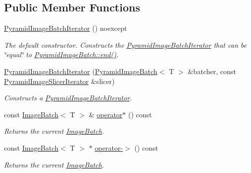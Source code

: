 \subsection*{Public Member Functions}
\begin{DoxyCompactItemize}
\item 
\hyperlink{group___imagery_module_ga9859e48a78c1a93cbc5d6ec39bfa33c4}{Pyramid\+Image\+Batch\+Iterator} () noexcept
\begin{DoxyCompactList}\small\item\em The default constructor. Constructs the \hyperlink{classdg_1_1deepcore_1_1imagery_1_1_pyramid_image_batch_iterator}{Pyramid\+Image\+Batch\+Iterator} that can be \char`\"{}equal\char`\"{} to \hyperlink{group___imagery_module_ga7e2fa7f2608bc1784f52c8f165fcc2f7}{Pyramid\+Image\+Batch\+::end()}. \end{DoxyCompactList}\item 
\hyperlink{group___imagery_module_gafaa065adfee60c6db16f2c398c438400}{Pyramid\+Image\+Batch\+Iterator} (\hyperlink{classdg_1_1deepcore_1_1imagery_1_1_pyramid_image_batch}{Pyramid\+Image\+Batch}$<$ T $>$ \&batcher, const \hyperlink{classdg_1_1deepcore_1_1imagery_1_1_pyramid_image_slicer_iterator}{Pyramid\+Image\+Slicer\+Iterator} \&slicer)
\begin{DoxyCompactList}\small\item\em Constructs a \hyperlink{classdg_1_1deepcore_1_1imagery_1_1_pyramid_image_batch_iterator}{Pyramid\+Image\+Batch\+Iterator}. \end{DoxyCompactList}\item 
const \hyperlink{structdg_1_1deepcore_1_1imagery_1_1_image_batch}{Image\+Batch}$<$ T $>$ \& \hyperlink{group___imagery_module_gac21ea85be8311510322c9fdd5c9ebe50}{operator$\ast$} () const 
\begin{DoxyCompactList}\small\item\em Returns the current \hyperlink{structdg_1_1deepcore_1_1imagery_1_1_image_batch}{Image\+Batch}. \end{DoxyCompactList}\item 
const \hyperlink{structdg_1_1deepcore_1_1imagery_1_1_image_batch}{Image\+Batch}$<$ T $>$ $\ast$ \hyperlink{group___imagery_module_gaccd917f1703532af22119b69f9f87acc}{operator-\/$>$} () const 
\begin{DoxyCompactList}\small\item\em Returns the current \hyperlink{structdg_1_1deepcore_1_1imagery_1_1_image_batch}{Image\+Batch}. \end{DoxyCompactList}\item 

\end{DoxyCompactItemize}
